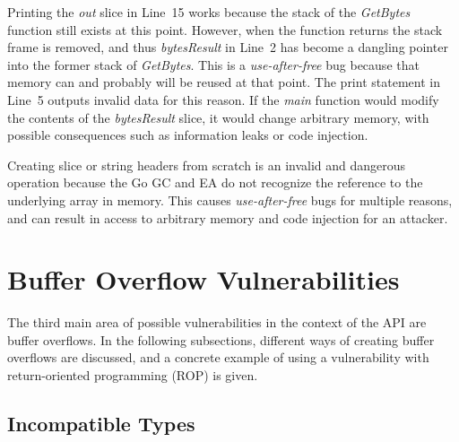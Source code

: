 Printing the \textit{out} slice in Line~15 works because the stack of the \textit{GetBytes} function still exists at
this point.
However, when the function returns the stack frame is removed, and thus \textit{bytesResult} in Line~2 has become a
dangling pointer into the former stack of \textit{GetBytes}.
This is a \textit{use-after-free} bug because that memory can and probably will be reused at that point.
The print statement in Line~5 outputs invalid data for this reason.
If the \textit{main} function would modify the contents of the \textit{bytesResult} slice, it would change arbitrary
memory, with possible consequences such as information leaks or code injection.

\begin{insight}
    Creating slice or string headers from scratch is an invalid and dangerous operation because the Go \acrshort{GC} and
    \acrshort{EA} do not recognize the reference to the underlying array in memory.
    This causes \textit{use-after-free} bugs for multiple reasons, and can result in access to arbitrary memory and code
    injection for an attacker.
\end{insight}



\section{Buffer Overflow Vulnerabilities}\label{sec:unsafe-security-problems:buffer-overflow}

The third main area of possible vulnerabilities in the context of the \unsafe{} \acrshort{API} are buffer overflows.
In the following subsections, different ways of creating buffer overflows are discussed, and a concrete example of
using a vulnerability with return-oriented programming (\acrshort{ROP}) is given.



\subsection{Incompatible Types}\label{subsec:unsafe-security-problems:slice-casts:incompatible-types}

